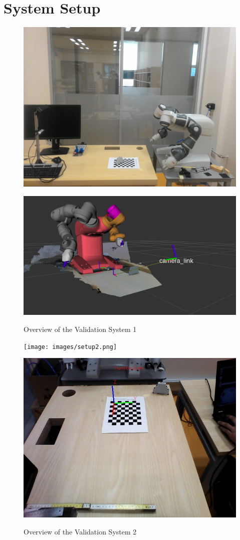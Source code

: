 \appendix
\chapter*{System Setup}
\label{chap:results}


\begin{figure}[htp]
\begin{center}
{
  \includegraphics[clip,width=0.6\columnwidth]{images/setup1.jpg}
}
\end{center}
\begin{center}
{
  \includegraphics[clip,width=0.6\columnwidth]{images/system1.jpg}
}
\end{center}
\caption{Overview of the Validation System 1}
\label{setupsystem1}
\end{figure}




\begin{figure}[htp]
\begin{center}
{
  \texttt{[image: images/setup2.png]}
}
\end{center}
\begin{center}
{
  \includegraphics[clip,width=0.6\columnwidth]{images/setup3.jpg}
}
\end{center}
\caption{Overview of the Validation System 2}
\label{setupsystem2}
\end{figure}



